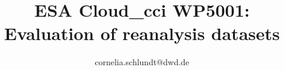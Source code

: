 \documentclass[a4paper,11pt]{article}
\begin{document}
\title{ESA Cloud\_cci WP5001: Evaluation of reanalysis datasets}
\author{cornelia.schlundt@dwd.de}
\maketitle
\tableofcontents

\newpage


% 

\newpage




% 
% 
\end{document}
